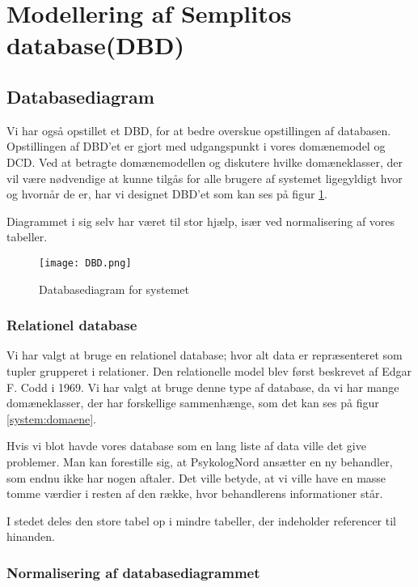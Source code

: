 \section{Modellering af Semplitos database(DBD)}
\label{kabitel:ModelleringDB}
\subsection{Databasediagram}
\label{DBD}


Vi har også opstillet et DBD, for at bedre overskue opstillingen af databasen.
Opstillingen af DBD'et er gjort med udgangspunkt i vores domænemodel og DCD.
Ved at betragte domænemodellen og diskutere hvilke domæneklasser, der vil være nødvendige at kunne tilgås for alle brugere af systemet ligegyldigt hvor og hvornår de er, har vi designet DBD'et som kan ses på figur \ref{fig:DBD}.

Diagrammet i sig selv har været til stor hjælp, især ved normalisering af vores tabeller. 

\begin{figure}[H]
    \caption{Databasediagram for systemet}
    \centering
        \texttt{[image: DBD.png]}
    \label{fig:DBD}
\end{figure}

\subsubsection{Relationel database}

Vi har valgt at bruge en relationel database; hvor alt data er repræsenteret som tupler grupperet i relationer.
Den relationelle model blev først beskrevet af Edgar F. Codd i 1969.
Vi har valgt at bruge denne type af database, da vi har mange domæneklasser, der har forskellige sammenhænge, som det kan ses på figur \ref{system:domaene}.

Hvis vi blot havde vores database som en lang liste af data ville det give problemer.
Man kan forestille sig, at PsykologNord ansætter en ny behandler, som endnu ikke har nogen aftaler.
Det ville betyde, at vi ville have en masse tomme værdier i resten af den række, hvor behandlerens informationer står.\cite{database}

I stedet deles den store tabel op i mindre tabeller, der indeholder referencer til hinanden.

\subsubsection{Normalisering af databasediagrammet}

